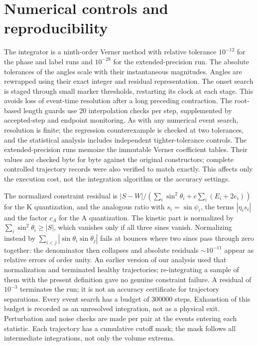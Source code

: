 \documentclass[12pt]{iopjournal}
\begin{document}
\section{Numerical controls and reproducibility}
The integrator is a ninth-order Verner method with relative tolerance $10^{-12}$ for the phase and
label runs and $10^{-28}$ for the extended-precision run. The absolute tolerances of the angles scale with their instantaneous magnitudes. Angles are rewrapped using their exact integer and residual representation.
The onset search is staged through small marker thresholds, restarting its clock at each stage.
This avoids loss of event-time resolution after a long preceding contraction. The root-based
length guards use 20 interpolation checks per step, supplemented by accepted-step and endpoint
monitoring. As with any numerical event search, resolution is finite; the regression counterexample
is checked at two tolerances, and the statistical analysis includes independent tighter-tolerance controls.
The extended-precision runs memoize the immutable Verner coefficient tables. Their values are checked
byte for byte against the original constructors; complete controlled trajectory records were also
verified to match exactly. This affects only the execution cost, not the integration algorithm or the accuracy settings.

The normalized constraint residual is $|S-W|/(\sum_i\sin^2\theta_i+c\sum_i(E_i+2e_i))$ for the
K quantization, and the analogous ratio with $s_i=\sin\psi_i$, the terms $|\eta_i s_i|$ and the factor
$c_A$ for the A quantization. The kinetic part is normalized by $\sum_i\sin^2\theta_i\ge|S|$, which
vanishes only if all three sines vanish. Normalizing instead by $\sum_{i<j}|\sin\theta_i\sin\theta_j|$
fails at bounces where two sines pass through zero together: the denominator then collapses and
absolute residuals $\sim10^{-11}$ appear as relative errors of order unity. An earlier version of our
analysis used that normalization and terminated healthy trajectories; re-integrating a sample of them
with the present definition gave no genuine constraint failure. A residual of $10^{-3}$ terminates the
run; it is not an accuracy certificate for trajectory separations. Every event search has a budget of 300000 steps.
Exhaustion of this budget is recorded as an unresolved integration, not as a physical exit. Perturbation and noise checks are made
per pair at the events entering each statistic. Each trajectory has a cumulative cutoff mask;
the mask follows all intermediate integrations, not only the volume extrema.
\end{document}
